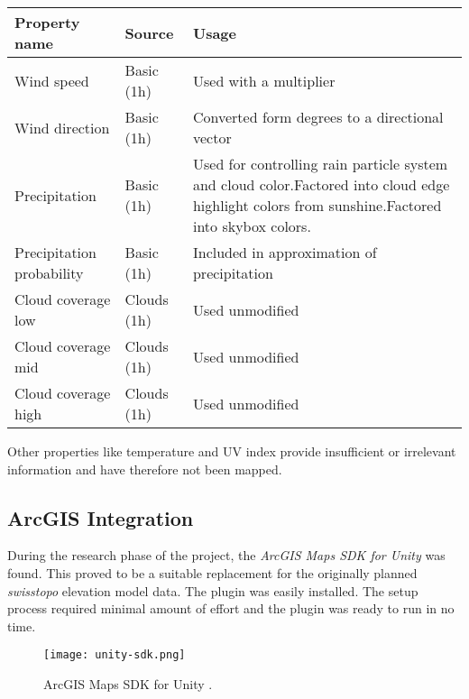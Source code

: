 \begin{tabularx}{\linewidth}{|l|l|X|}
    \hline
    \textbf{Property name}      & \textbf{Source}     & \textbf{Usage}                                 \\ \hline
    Wind speed                  & Basic (1h)          & Used with a multiplier                         \\ \hline
    Wind direction              & Basic (1h)          & Converted form degrees to a directional vector \\ \hline
    Precipitation               & Basic (1h)          & Used for controlling rain particle system and cloud color.\newline Factored into cloud edge highlight colors from sunshine.\newline Factored into skybox colors. \\ \hline
    Precipitation probability   & Basic (1h)          & Included in approximation of precipitation     \\ \hline
    Cloud coverage low          & Clouds (1h)         & Used unmodified                                \\ \hline
    Cloud coverage mid          & Clouds (1h)         & Used unmodified                                \\ \hline
    Cloud coverage high         & Clouds (1h)         & Used unmodified                                \\ \hline
\end{tabularx}
\emptyline
Other properties like temperature and UV index provide insufficient or irrelevant information and have therefore not been mapped.

\clearpage

\subsection{ArcGIS Integration}
\label{section:techimpl:arcgis}
During the research phase of the project, the \emph{ArcGIS Maps SDK for Unity} \cite{arcgis:unitysdk} was found. This proved to be a suitable replacement for the originally planned \emph{swisstopo} elevation model data.
The plugin was easily installed. The setup process required minimal amount of effort and the plugin was ready to run in no time. 

\begin{figure}[H]
    \texttt{[image: unity-sdk.png]}
    \caption{ArcGIS Maps SDK for Unity \protect\cite{arcgis:unitysdk}.}
\end{figure}

